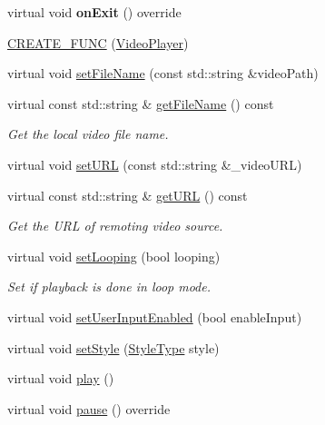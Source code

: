 \begin{DoxyCompactItemize}
virtual void {\bfseries on\+Exit} () override
\item 
\hyperlink{classexperimental_1_1ui_1_1VideoPlayer_a4030f5cbef6122fc7b377b21c641466b}{C\+R\+E\+A\+T\+E\+\_\+\+F\+U\+NC} (\hyperlink{classexperimental_1_1ui_1_1VideoPlayer}{Video\+Player})
\item 
virtual void \hyperlink{classexperimental_1_1ui_1_1VideoPlayer_a329b486cfda4e7ec8e22945f4f22ea62}{set\+File\+Name} (const std\+::string \&video\+Path)
\item 
virtual const std\+::string \& \hyperlink{classexperimental_1_1ui_1_1VideoPlayer_a82c2ba3d951b67d69420a83cd615d8b5}{get\+File\+Name} () const
\begin{DoxyCompactList}\small\item\em Get the local video file name. \end{DoxyCompactList}\item 
virtual void \hyperlink{classexperimental_1_1ui_1_1VideoPlayer_a2491bab42a29abbb44710aecb730b566}{set\+U\+RL} (const std\+::string \&\+\_\+video\+U\+RL)
\item 
virtual const std\+::string \& \hyperlink{classexperimental_1_1ui_1_1VideoPlayer_a30f50a39a6fac899967613866ec274c1}{get\+U\+RL} () const
\begin{DoxyCompactList}\small\item\em Get the U\+RL of remoting video source. \end{DoxyCompactList}\item 
virtual void \hyperlink{classexperimental_1_1ui_1_1VideoPlayer_ac9a14f276f28fed8fde5c29f79402f1f}{set\+Looping} (bool looping)
\begin{DoxyCompactList}\small\item\em Set if playback is done in loop mode. \end{DoxyCompactList}\item 
virtual void \hyperlink{classexperimental_1_1ui_1_1VideoPlayer_a1adc885898d12a1aba789699ed0ed84e}{set\+User\+Input\+Enabled} (bool enable\+Input)
\item 
virtual void \hyperlink{classexperimental_1_1ui_1_1VideoPlayer_a89e6a62ff9b3b05281a31180098a1ed3}{set\+Style} (\hyperlink{classexperimental_1_1ui_1_1VideoPlayer_a65711269d4eca8fe125aeda2928a80ec}{Style\+Type} style)
\item 
virtual void \hyperlink{classexperimental_1_1ui_1_1VideoPlayer_a13ba0d270e849566f33ceffd7fb425c0}{play} ()
\item 
virtual void \hyperlink{classexperimental_1_1ui_1_1VideoPlayer_a420bb0e3cdf1e34d257f1a9f0cb25436}{pause} () override

\end{DoxyCompactItemize}
